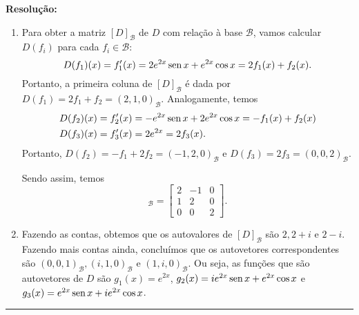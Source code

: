 \documentclass[leqno]{article}
\numberwithin{equation}{section}
\newenvironment{sol} 
{
    \vspace{4mm}
    \noindent\textbf{Resolução:}
    \strut\newline
    \smallskip
    \hspace{-3.5mm} 
} 
{\noindent\rule{4cm}{.1mm}}
\begin{document}
\begin{enumerate}
\begin{sol}

    \begin{enumerate}[label=(\alph*)]
        \item Para obter a matriz \( [D]_{ \mathcal{B} } \) de \( D \) com relação à base \( \mathcal{B} \), vamos calcular \( D ( f_{ i } ) \) para cada \( f_{ i } \in \mathcal{B} \):
            \begin{equation*}
                D ( f_{ 1 } ) ( x ) = f_{ 1 }' ( x ) = 2 e^{ 2x } \operatorname{sen} x + e^{ 2x } \cos x = 2 f_{ 1 } ( x ) + f_{ 2 } ( x )
            .\end{equation*}
            Portanto, a primeira coluna de \( [D]_{ \mathcal{B} } \) é dada por \( D ( f_{ 1 } ) = 2 f_{ 1 } + f_{ 2 } = ( 2, 1, 0 )_{ \mathcal{B} } \).
            Analogamente, temos
            \begin{align*}
                D ( f_{ 2 } ) ( x ) &= f_{ 2 }' ( x ) = - e^{ 2x } \operatorname{sen} x + 2 e^{ 2x } \cos x = - f_{ 1 } ( x ) + f_{ 2 } ( x ) \\
                D ( f_{ 3 } ) ( x ) &= f_{ 3 }' ( x ) = 2 e^{ 2x } = 2 f_{ 3 } ( x )
            .\end{align*}
            Portanto, \( D ( f_{ 2 } ) = - f_{ 1 } + 2 f_{ 2 } = ( - 1, 2, 0 )_{ \mathcal{B} } \) e \( D ( f_{ 3 } ) = 2 f_{ 3 } = ( 0, 0, 2 )_{ \mathcal{B} } \).

            Sendo assim, temos
            \begin{equation*}
                [D]_{ \mathcal{B} } =
                \begin{bmatrix}
                    2 & -1 & 0 \\
                    1 & 2 & 0 \\
                    0 & 0 & 2
                \end{bmatrix}
            .\end{equation*}

        \item Fazendo as contas, obtemos que os autovalores de \( [D]_{ \mathcal{B} } \) são \( 2, 2 + i \) e \( 2 - i \).
            Fazendo mais contas ainda, concluímos que os autovetores correspondentes são \( ( 0, 0, 1 )_{ \mathcal{B} }, ( i, 1, 0 )_{ \mathcal{B} } \) e \( ( 1, i, 0 )_{ \mathcal{B} } \).
            Ou seja, as funções que são autovetores de \( D \) são \( g_{ 1 } ( x ) = e^{ 2x } \), \( g_{ 2 } ( x ) = i e^{ 2x } \operatorname{sen} x + e^{ 2x } \cos x \) e \( g_{ 3 } ( x ) = e^{ 2x } \operatorname{sen} x + i e^{ 2x } \cos x \).
    \end{enumerate}
\end{sol}
\end{enumerate}
\end{document}
